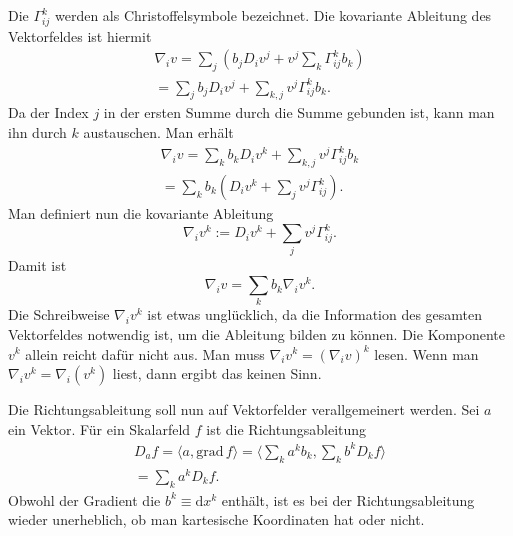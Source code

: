 \documentclass[a4paper,11pt,fleqn,twocolumn,twoside]{scrartcl}
\numberwithin{equation}{section}
\begin{document}
Die $\Gamma_{ij}^k$ werden als Christoffelsymbole bezeichnet.
Die kovariante Ableitung des Vektorfeldes ist hiermit
\begin{gather}
\nabla_i v  = \sum_{j}(b_jD_i v^j+v^j\sum_{k} \Gamma_{ij}^k b_k)\\
= \sum_{j}b_jD_i v^j+\sum_{k,j}v^j \Gamma_{ij}^k b_k.
\end{gather}
Da der Index $j$ in der ersten Summe durch die Summe gebunden ist,
kann man ihn durch $k$ austauschen. Man erhält
\begin{gather}
\nabla_i v = \sum_{k}b_kD_i v^k+\sum_{k,j}v^j \Gamma_{ij}^k b_k\\
= \sum_{k}b_k(D_i v^k+\sum_{j}v^j\Gamma_{ij}^k).
\end{gather}
Man definiert nun die kovariante Ableitung
\begin{equation}
\nabla_i v^k := D_i v^k+\sum_{j}v^j\Gamma_{ij}^k.
\end{equation}
Damit ist
\begin{equation}
\nabla_i v = \sum_{k}b_k\nabla_i v^k.
\end{equation}
Die Schreibweise $\nabla_i v^k$ ist etwas unglücklich, da die
Information des gesamten Vektorfeldes notwendig ist, um die Ableitung
bilden zu können. Die Komponente $v^k$ allein reicht dafür nicht
aus. Man muss $\nabla_i v^k=(\nabla_i v)^k$ lesen. Wenn man
$\nabla_i v^k=\nabla_i(v^k)$ liest, dann ergibt das keinen Sinn.

Die Richtungsableitung soll nun auf Vektorfelder verallgemeinert
werden. Sei $a$ ein Vektor. Für ein Skalarfeld $f$ ist die
Richtungsableitung
\begin{gather*}
{D_a}f = \langle a,\mathrm{grad}\,f\rangle
= \langle \sum_k a^kb_k,\sum_k b^k D_k f\rangle\\
= \sum_k a^k D_k f.
\end{gather*}
Obwohl der Gradient die $b^k\equiv\mathrm dx^k$ enthält, ist es bei
der Richtungsableitung wieder unerheblich, ob man kartesische
Koordinaten hat oder nicht.
\end{document}
